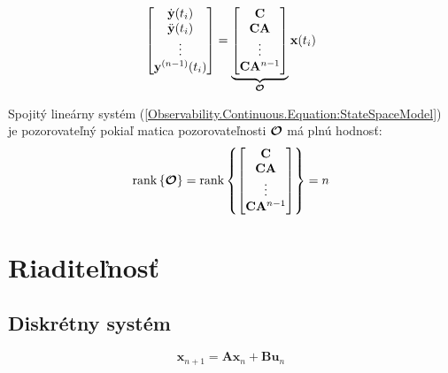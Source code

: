 \documentclass[a4paper, 10pt, ]{article}
\begin{document}
\begin{equation}
    \begin{bmatrix}
        \dot{\mathbf{y}}(t_i)     \\
        \ddot{\mathbf{y}}(t_i)    \\
        \vdots                \\
        \mathbf{y}^{(n - 1)}(t_i)
    \end{bmatrix} = 
    \underbrace{
        \begin{bmatrix}
            \mathbf{C}                \\
            \mathbf{C} \mathbf{A}         \\
            \vdots                \\
            \mathbf{C} \mathbf{A}^{n - 1} \\
        \end{bmatrix}
    }_{\boldsymbol{\mathcal{O}}}
    \mathbf{x}(t_i)
\end{equation}

\begin{theorem}
    Spojitý lineárny systém (\ref{Observability.Continuous.Equation:StateSpaceModel}) je pozorovateľný pokiaľ matica pozorovateľnosti $\boldsymbol{\mathcal{O}}$ má plnú hodnosť:
    \begin{equation}
        \label{Observability.Continuous.Equation:ObservabilityTheorem}
        \mathrm{rank} \left\{ \boldsymbol{\mathcal{O}} \right\} = 
        \mathrm{rank} \left\{
            \begin{bmatrix}
                \mathbf{C}                \\
                \mathbf{C} \mathbf{A}         \\
                \vdots                \\
                \mathbf{C} \mathbf{A}^{n - 1} \\
            \end{bmatrix}
        \right\} = 
        n
    \end{equation}
\end{theorem}



\section{Riaditeľnosť}


\subsection{Diskrétny systém}

\begin{equation}
    \label{Controllability.Discrete.Equation:StateSpaceModel}
    \bm{x}_{n + 1} = \bm{A} \bm{x}_{n} + \bm{B} \bm{u}_{n}
\end{equation}
\end{document}
